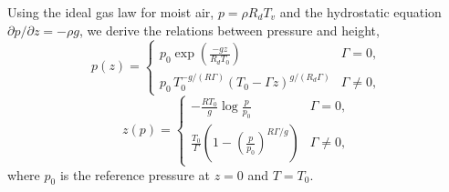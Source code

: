 Using the ideal gas law for moist air, $p = \rho R_d T_v$ and the hydrostatic equation $\partial p/\partial z = -\rho g$, we derive the relations between pressure and height,
\begin{equation}\label{eq:hydrostatic_pressure_profile}
  p(z) = \begin{cases}
          p_0\exp\left(\frac{-g z}{R_dT_0}\right) & \Gamma = 0,\\[0.5em]
          p_0\, T_0^{-g/(R\Gamma)}\left(T_0 - \Gamma z\right)^{g/(R_d\Gamma)} & \Gamma \ne 0,
        \end{cases}
\end{equation}
\begin{equation}\label{eq:hydrostatic_height_profile}
  z(p) = \begin{cases}
         -\frac{R T_0}{g}\log\frac{p}{p_0} & \Gamma = 0,\\[0.5em]
         \frac{T_0}{\Gamma}\left(1 - \left(\frac{p}{p_0}\right)^{R\Gamma/g}\right) & \Gamma \ne 0,
       \end{cases}
\end{equation}
where $p_0$ is the reference pressure at $z=0$ and $T=T_0$.

